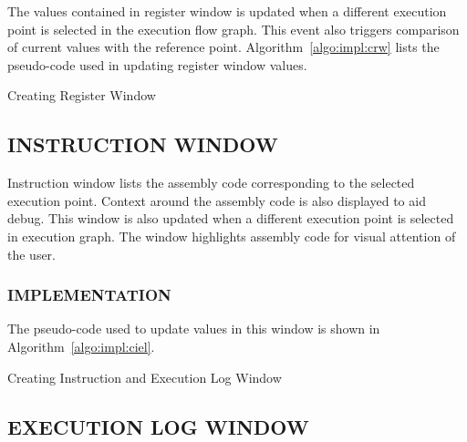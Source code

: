 The values contained in register window is updated when a different execution point is selected in the execution flow graph. This event also triggers comparison of current values with the reference point. Algorithm~\ref{algo:impl:crw} lists the pseudo-code used in updating register window values.

\IncMargin{1em}
\begin{algorithm}[h]
\DontPrintSemicolon
{} 
\BlankLine
{}
\caption{Creating Register Window}
\label{algo:impl:crw}
\end{algorithm}\DecMargin{1em}

\subsection {INSTRUCTION WINDOW}

Instruction window lists the assembly code corresponding to the selected execution point. Context around the assembly code is also displayed to aid debug. This window is also updated when a different execution point is selected in execution graph. The window highlights assembly code for visual attention of the user.

\subsubsection{IMPLEMENTATION}

The pseudo-code used to update values in this window is shown in Algorithm~\ref{algo:impl:ciel}.

\IncMargin{1em}
\begin{algorithm}[h]
\DontPrintSemicolon
{} 
\caption{Creating Instruction and Execution Log Window}
\label{algo:impl:ciel}
\end{algorithm}\DecMargin{1em}

\subsection {EXECUTION LOG WINDOW}

